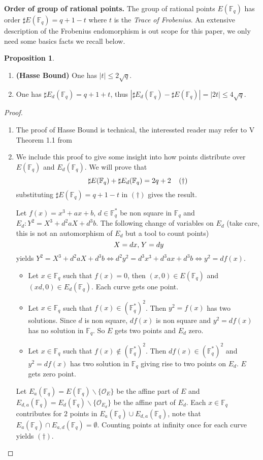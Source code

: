 \documentclass[10pt]{article}
\theoremstyle{definition}
\newtheorem{proposition}{Proposition}
\newcommand{\F}{\mathbb{F}}
\begin{document}
\noindent \textbf{Order of group of rational points.} The group of rational points $E(\F_q)$ has order $\sharp E(\F_q) = q + 1 -t$ where $t$ is the \textsl{Trace of Frobenius}.
An extensive description of the Frobenius endomorphism is out scope for this paper, we only need some basics facts we recall below.

\begin{proposition}
\begin{enumerate}
\item \textbf{(Hasse Bound)} One has $|t|  \leq 2 \sqrt{q}$.
\item One has $\sharp{} E_d(\F_q) = q+1+t$, thus $|\sharp{} E_d(\F_q) - \sharp{}E(\F_q)| = |2t|  \leq 4\sqrt{q}$.
\end{enumerate}
\end{proposition}
\begin{proof}
\begin{enumerate}
\item The proof of Hasse Bound is technical, the interessted reader may refer to V Theorem 1.1 from \cite{Silverman:EC} 
\item We include this proof to give some insight into how points distribute over $E(\F_q)$ and $E_d(\F_q)$.
We will prove that 
\[  \sharp{}E(\F_q) + \sharp{}E_d(\F_q) = 2q+2 \mkern20mu (\dagger)\]
substituting $\sharp E(\F_q) = q + 1 -t$ in $(\dagger)$ gives the result.

Let $f(x) = x^3+ax+b$, $d \in \F_q^*$ be non square in $\F_q$ and $E_d : Y^2 = X^3+d^2aX+d^3b$.
The following change of variables on $E_d$ (take care, this is not an automorphism of $E_d$ but a tool to count points)
\[ X = dx, \mkern2mu Y = dy \]
yields $ Y^2 = X^3+d^2aX+d^3b \Leftrightarrow d^2y^2 = d^3x^3+d^3ax+d^3b \Leftrightarrow y^2 = df(x)$. 

\begin{itemize}
\item Let $x \in \F_q$ such that $f(x) = 0$, then $(x,0) \in E(\F_q)$ and $(xd,0) \in E_d(\F_q)$.
Each curve gets one point.
\item Let $x \in \F_q$ such that $f(x) \in (\F_q^*)^2$.
Then $y^2 = f(x)$ has two solutions.
Since $d$ is non square, $df(x)$ is non square and $y^2 = df(x)$ has no solution in $\F_q$.
So $E$ gets two points and $E_d$ zero.
\item  Let $x \in \F_q$ such that $f(x) \notin (\F_q^*)^2$.
Then $df(x) \in (\F_q^*)^2$ and $y^2 = df(x)$ has two solution in $\F_q$ giving rise to two points on $E_d$.
$E$ gets zero point.
\end{itemize}
Let $E_a(\F_q) = E(\F_q) \backslash \lbrace \mathcal{O}_E \rbrace$ be the affine part of $E$ and $E_{d,a}(\F_q) = E_d(\F_q) \backslash \lbrace \mathcal{O}_{E_d} \rbrace$ be the affine part of $E_d$.
Each $x \in \F_q$ contributes for $2$ points in $E_a(\F_q) \cup E_{d,a}(\F_q)$, note that $E_a(\F_q) \cap E_{a,d}(\F_q) =\emptyset $.
Counting points at infinity once for each curve yields $(\dagger)$.
\end{enumerate}
\end{proof}
\end{document}
